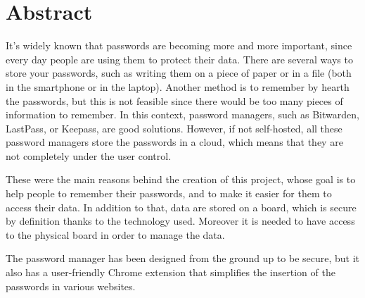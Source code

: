 \chapter*{Abstract}

It's widely known that passwords are becoming more and more important, since every day people are using them to protect their data. There are several ways to store your passwords, such as writing them on a piece of paper or in a file (both in the smartphone or in the laptop). Another method is to remember by hearth the passwords, but this is not feasible since there would be too many pieces of information to remember. In this context, password managers, such as Bitwarden, LastPass, or Keepass, are good solutions. However, if not self-hosted, all these password managers store the passwords in a cloud, which means that they are not completely under the user control. 

These were the main reasons behind the creation of this project, whose goal is to help people to remember their passwords, and to make it easier for them to access their data. In addition to that, data are stored on a board, which is secure by definition thanks to the technology used. Moreover it is needed to have access to the physical board in order to manage the data. 

The password manager has been designed from the ground up to be secure, but it also has a user-friendly Chrome extension that simplifies the insertion of the passwords in various websites.